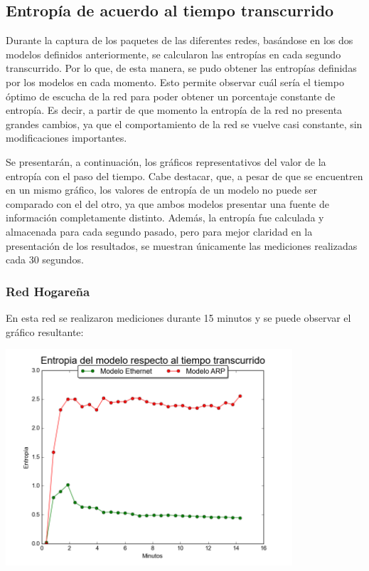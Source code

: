 \subsection{Entropía de acuerdo al tiempo transcurrido}

Durante la captura de los paquetes de las diferentes redes, basándose en los dos modelos definidos anteriormente, se calcularon las entropías en cada segundo transcurrido. Por lo que, de esta manera, se pudo obtener las entropías definidas por los modelos en cada momento. Esto permite observar cuál sería el tiempo óptimo de escucha de la red para poder obtener un porcentaje constante de entropía. Es decir, a partir de que momento la entropía de la red no presenta grandes cambios, ya que el comportamiento de la red se vuelve casi constante, sin modificaciones importantes. 

Se presentarán, a continuación, los gráficos representativos del valor de la entropía con el paso del tiempo. Cabe destacar, que, a pesar de que se encuentren en un mismo gráfico, los valores de entropía de un modelo no puede ser comparado con el del otro, ya que ambos modelos presentar una fuente de información completamente distinto. Además, la entropía fue calculada y almacenada para cada segundo pasado, pero para mejor claridad en la presentación de los resultados, se muestran únicamente las mediciones realizadas cada 30 segundos. 

\subsubsection{Red Hogareña}
En esta red se realizaron mediciones durante 15 minutos y se puede observar el gráfico resultante:

\centerline{\includegraphics[width=0.8\textwidth]{./graficos/entrophyVSTime/casa_mari.png}}

